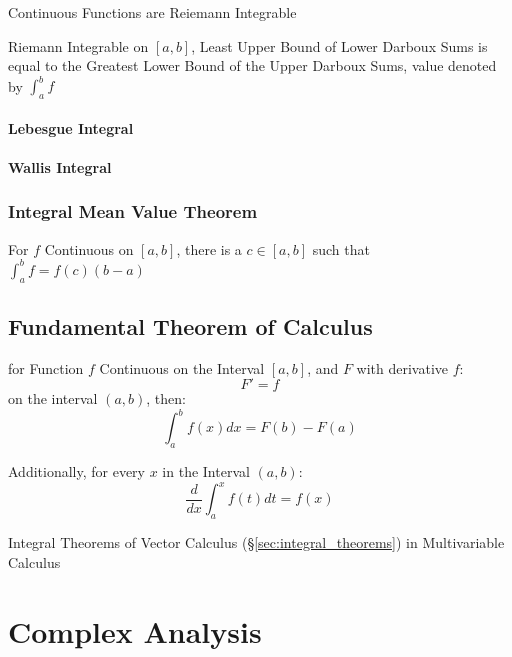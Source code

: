Continuous Functions are Reiemann Integrable

Riemann Integrable on $[a,b]$, Least Upper Bound of Lower Darboux Sums
is equal to the Greatest Lower Bound of the Upper Darboux Sums, value
denoted by $\int_a^b f$



\paragraph{Lebesgue Integral}\label{sec:lebesgue_integral}\hfill

\paragraph{Wallis Integral}\label{sec:wallis_integral}\hfill



\subsubsection{Integral Mean Value Theorem}
\label{sec:integral_mean_value}

For $f$ Continuous on $[a,b]$, there is a $c \in [a,b]$ such that
$\int_a^b f = f(c)(b - a)$



\subsection{Fundamental Theorem of Calculus}
\label{sec:fundamental_calculus_theorem}

for Function $f$ Continuous on the Interval $[a,b]$, and $F$ with derivative
$f$:
\[
  F' = f
\]
on the interval $(a,b)$, then:
\[
  \int^b_a f(x) dx = F(b) - F(a)
\]

Additionally, for every $x$ in the Interval $(a,b)$:
\[
  \frac{d}{dx}\int^x_a f(t) dt = f(x)
\]

\fist Integral Theorems of Vector Calculus
(\S\ref{sec:integral_theorems}) in Multivariable Calculus



\section{Complex Analysis}\label{sec:complex_analysis}

